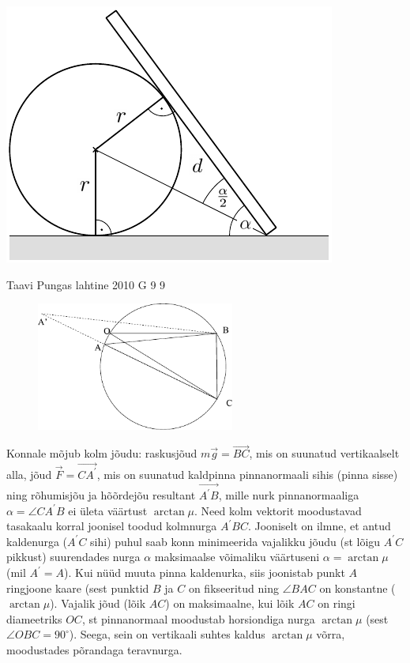 \documentclass[11pt]{article}
\begin{document}
{{\begin{center}
	\includegraphics[width=0.7\linewidth]{2008-v3g-09-lah2}
\end{center}
\fi
}

{Taavi Pungas} %
{lahtine} %
{2010} %
{G 9} %
{9} %
{

\ifSolution
\begin{figure}
	\vspace{-4ex}
	\includegraphics[width=65mm]{2010-lahg-09-lah}
	\vspace{-6ex}
\end{figure}
Konnale mõjub kolm jõudu: raskusjõud $m\vec g = \vec {BC}$, mis on suunatud vertikaalselt alla, jõud $\vec F =\vec {CA^\prime}$, 
mis on suunatud kaldpinna pinnanormaali sihis (pinna sisse)
ning rõhumisjõu ja hõõrdejõu resultant $\vec {A^\prime B}$, mille nurk pinnanormaaliga $\alpha=\angle CA^\prime B$ ei ületa väärtust 
$\arctan \mu$. Need kolm vektorit moodustavad tasakaalu korral
joonisel toodud kolmnurga $A^\prime BC$. Jooniselt on ilmne, et antud kaldenurga 
($A^\prime C$ sihi) puhul saab konn minimeerida vajalikku jõudu (st lõigu $A^\prime C$ pikkust) 
suurendades nurga $\alpha$ maksimaalse võimaliku väärtuseni $\alpha = \arctan \mu$ (mil $A^\prime = A$). Kui nüüd muuta pinna kaldenurka, 
siis joonistab punkt $A$ ringjoone kaare (sest punktid $B$ ja $C$ on fikseeritud ning $\angle BAC$ on konstantne ($\arctan \mu$). 
Vajalik jõud (lõik $AC$) on maksimaalne, kui lõik $AC$ on ringi diameetriks $OC$, st pinnanormaal moodustab horsiondiga 
nurga $\arctan\mu$ (sest $\angle OBC=90^\circ$). Seega, sein on vertikaali suhtes kaldus $\arctan \mu$ võrra, moodustades põrandaga teravnurga.

}}
\end{document}
